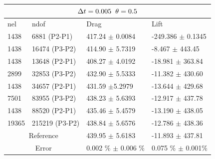 \begin{table}[h!]
\begin{tabular}{ |p{1cm}||p{2.9cm}|p{3.3cm}|p{3.3cm}|}
  \hline
  \multicolumn{4}{|c|}{$\Delta t = 0.005 \hspace{2mm} \theta = 0.5$} \\
   \hline
nel & ndof & Drag  & Lift \\
\hline
 1438    & 6881  (P2-P1)   &  417.24  $\pm$  0.0084 & -249.386   $\pm$ 0.1345  \\
 1438    & 16474 (P3-P2)   & 414.90     $\pm$  5.7319 & -8.467 $\pm$  443.45  \\
\hline
 1438    &13648  (P2-P1)   & 408.27   $\pm$ 4.0192 & -18.981   $\pm$ 363.84 \\
 2899    &  32853 (P3-P2)   & 432.90      $\pm$  5.5333 & -11.382      $\pm$  430.60 \\
 \hline
 1438    & 34657  (P2-P1)   & 431.59 $\pm$5.2979 & -13.644   $\pm$ 429.68 \\
 7501    & 83955 (P3-P2)  & 438.23      $\pm$  5.6393 & -12.917 $\pm$  437.78 \\
 \hline
 1438    & 88520  (P2-P1)   & 435.46  $\pm$ 5.4579 & -13.190   $\pm$ 438.05 \\
 19365   & 215219 (P3-P2)  & 438.84    $\pm$  5.6576 & -12.786      $\pm$  438.36 \\
\hline
 \multicolumn{2}{|c|}{Reference}  & 439.95 $\pm$ 5.6183 & -11.893 $\pm$ 437.81\\
 \hline
  \multicolumn{2}{|c|}{Error}  & 0.002 \% $\pm$ 0.006 \% & 0.075 \% $\pm$ 0.001\% \\
  \hline
\end{tabular}
\end{table}

\newpage \newpage \newpage \newpage \newpage
